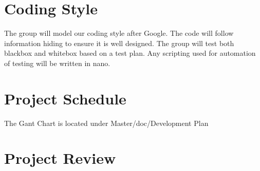 \documentclass{article}
\begin{document}
\section{Coding Style}
The group will model our coding style after Google. The code will follow information hiding to ensure it is well designed. The group will test both blackbox and whitebox based on a test plan. Any scripting used for automation of testing will be written in nano.
\section{Project Schedule}
The Gant Chart is located under Master/doc/Development Plan
\section{Project Review}
\end{document}
